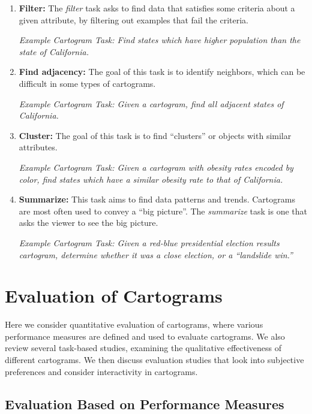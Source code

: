 \documentclass{egpubl}
\begin{document}
\begin{enumerate}[1.]
\item \textbf{Filter:}
The  \textit{filter} task asks to find data that satisfies some criteria about a given attribute, by filtering out examples that fail the criteria.


\textit{Example Cartogram Task: Find states which have higher population than the state of California.}

\item \textbf{Find adjacency:}
The goal of this task is to identify neighbors, which can be difficult in some types of cartograms.


\textit{Example Cartogram Task:  Given a cartogram, find all adjacent states of California.}


\item \textbf{Cluster:}
The goal of this task is to find ``clusters'' or objects with similar attributes.


\textit{Example Cartogram Task:  Given a cartogram with obesity rates encoded by color, find states which have a similar obesity rate to that of California.}

\item \textbf{Summarize:} This task aims to find data patterns and trends. 
Cartograms are most often used to convey a ``big picture''. The \textit{summarize} task is one that asks the viewer to see the big picture. 

\textit{Example Cartogram Task:  Given a red-blue presidential election results cartogram, determine whether it was a close election, or a ``landslide win.''}



\end{enumerate}




\section{Evaluation of Cartograms}

Here we consider quantitative evaluation of cartograms, where various performance measures are defined and used to evaluate cartograms. We also review several task-based studies, examining the qualitative effectiveness of different cartograms. We then discuss evaluation studies that look into subjective preferences and consider interactivity in cartograms.


\subsection{Evaluation Based on Performance Measures}
\end{document}

